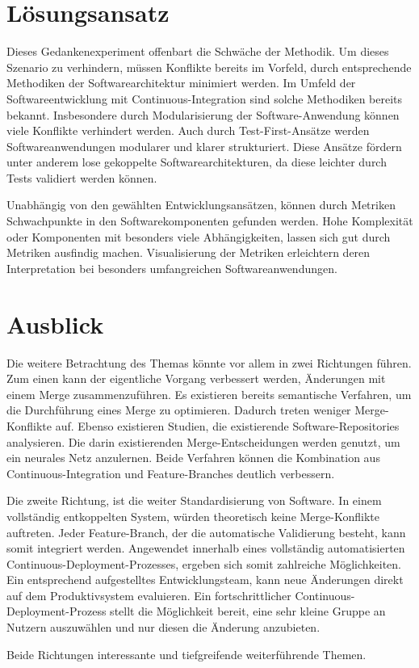 \section{Lösungsansatz}

Dieses Gedankenexperiment offenbart die Schwäche der Methodik. Um dieses Szenario zu verhindern, müssen Konflikte bereits im Vorfeld, durch entsprechende Methodiken der Softwarearchitektur minimiert werden. Im Umfeld der Softwareentwicklung mit Continuous-Integration sind solche Methodiken bereits bekannt. Insbesondere durch Modularisierung der Software-Anwendung können viele Konflikte verhindert werden. Auch durch Test-First-Ansätze werden Softwareanwendungen modularer und klarer strukturiert. Diese Ansätze fördern unter anderem \glqq lose gekoppelte\grqq{}  Softwarearchitekturen, da diese leichter durch Tests validiert werden können. 

Unabhängig von den gewählten Entwicklungsansätzen, können durch Metriken\\ Schwachpunkte in den Softwarekomponenten gefunden werden. Hohe Komplexität oder Komponenten mit besonders viele Abhängigkeiten, lassen sich gut durch Metriken ausfindig machen. Visualisierung der Metriken erleichtern deren Interpretation bei besonders umfangreichen Softwareanwendungen. 

\section{Ausblick}

Die weitere Betrachtung des Themas könnte vor allem in zwei Richtungen führen. Zum einen kann der eigentliche Vorgang verbessert werden, Änderungen mit einem Merge zusammenzuführen. Es existieren bereits semantische Verfahren, um die Durchführung eines Merge zu optimieren. Dadurch treten weniger Merge-Konflikte auf. Ebenso existieren Studien, die existierende Software-Repositories analysieren. Die darin existierenden Merge-Entscheidungen werden genutzt, um ein neurales Netz anzulernen. Beide Verfahren können die Kombination aus Continuous-Integration und Feature-Branches deutlich verbessern.

Die zweite Richtung, ist die weiter Standardisierung von Software. In einem vollständig entkoppelten System, würden theoretisch keine Merge-Konflikte auftreten. Jeder Feature-Branch, der die automatische Validierung besteht, kann somit integriert werden. Angewendet innerhalb eines vollständig automatisierten Continuous-Deployment-Prozesses, ergeben sich somit zahlreiche Möglichkeiten. Ein entsprechend aufgestelltes Entwicklungsteam, kann neue Änderungen direkt auf dem Produktivsystem evaluieren. Ein fortschrittlicher Continuous-Deployment-Prozess stellt die Möglichkeit bereit, eine sehr kleine Gruppe an Nutzern auszuwählen und nur diesen die Änderung anzubieten.

Beide Richtungen interessante und tiefgreifende weiterführende Themen.